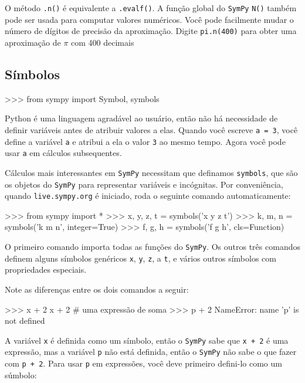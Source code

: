 \noindent
O método \texttt{.n()} é equivalente a \texttt{.evalf()}.
A função global do \texttt{SymPy} \texttt{N()} também pode ser usada para computar valores numéricos.
%
Você pode facilmente mudar o número de dígitos de precisão da aproximação.									
Digite \texttt{pi.n(400)} para obter uma aproximação de $\pi$ com 400 decimais

\subsection{Símbolos}
\label{basics:symbols}

\small
\begin{verbatimtab}
>>> from sympy import Symbol, symbols
\end{verbatimtab}
\normalsize


Python é uma linguagem agradável ao usuário, então não há necessidade de definir variáveis antes de atribuir valores a elas.
Quando você escreve \texttt{a = 3}, você define a variável \texttt{a} e atribui a ela o valor \texttt{3} ao mesmo tempo.
Agora você pode usar \texttt{a} em cálculos subsequentes.

Cálculos mais interessantes em \texttt{SymPy} necessitam que definamos \texttt{symbols}, que são os objetos do \texttt{SymPy} para representar variáveis e incógnitas. Por conveniência, quando \texttt{live.sympy.org} é iniciado, roda o seguinte comando automaticamente:  

\small
\begin{verbatimtab}
>>> from sympy import *
>>> x, y, z, t = symbols('x y z t')
>>> k, m, n = symbols('k m n', integer=True)
>>> f, g, h = symbols('f g h', cls=Function)
\end{verbatimtab}
\normalsize

\noindent
O primeiro comando importa todas as funções do \texttt{SymPy}. Os outros três comandos definem alguns símbolos genéricos \texttt{x}, \texttt{y}, \texttt{z}, a \texttt{t}, e vários outros símbolos com propriedades especiais.

Note as diferenças entre os dois comandos a seguir:

\small
\begin{verbatimtab}
>>> x + 2           
x + 2                 # uma expressão de soma
>>> p + 2 
NameError: name 'p' is not defined
\end{verbatimtab}
\normalsize

\noindent
A variável \texttt{x} é definida como um símbolo, então o \texttt{SymPy} sabe que \texttt{x + 2} é uma expressão, mas a variável \texttt{p} não está definida, então o \texttt{SymPy} não sabe o que fazer com \texttt{p + 2}. Para usar \texttt{p} em expressões, você deve primeiro defini-lo como um súmbolo:

